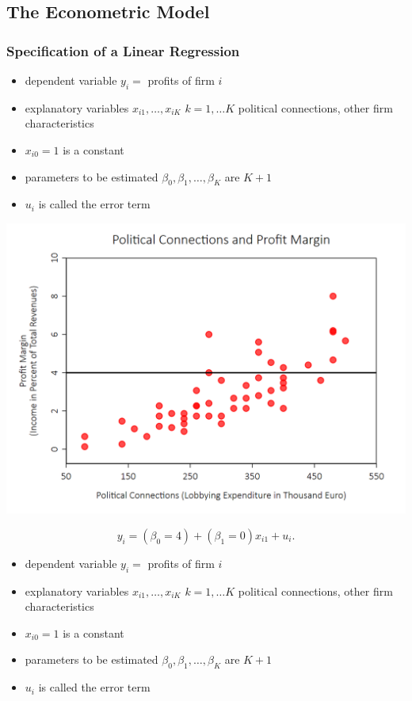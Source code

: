\documentclass[a4paper,12pt]{article}
\begin{document}
\clearpage
\subsection{The Econometric Model}


\subsubsection*{Specification of a Linear Regression}
%



    \begin{itemize}
        \item dependent variable $y_i = $ profits of firm $i$
        \item explanatory variables $x_{i1}, \ldots, x_{iK}$ $k=1,\ldots K$ political connections, other firm characteristics
        \item $x_{i0} = 1$ is a constant
        \item parameters to be estimated $\beta_0, \beta_1, \ldots, \beta_K$ are $K+1$
        \item $u_i$ is called the error term
    \end{itemize}


        \includegraphics[width=.9\textwidth]{figures/politicallyconnected2}


$$y_i = (\beta_0=4) + (\beta_1=0) x_{i1} + u_{i}.$$\vspace{5pt}



    \begin{itemize}
        \item dependent variable $y_i = $ profits of firm $i$
        \item explanatory variables $x_{i1}, \ldots, x_{iK}$ $k=1,\ldots K$ political connections, other firm characteristics
        \item $x_{i0} = 1$ is a constant
        \item parameters to be estimated $\beta_0, \beta_1, \ldots, \beta_K$ are $K+1$
        \item $u_i$ is called the error term
    \end{itemize}
\end{document}
